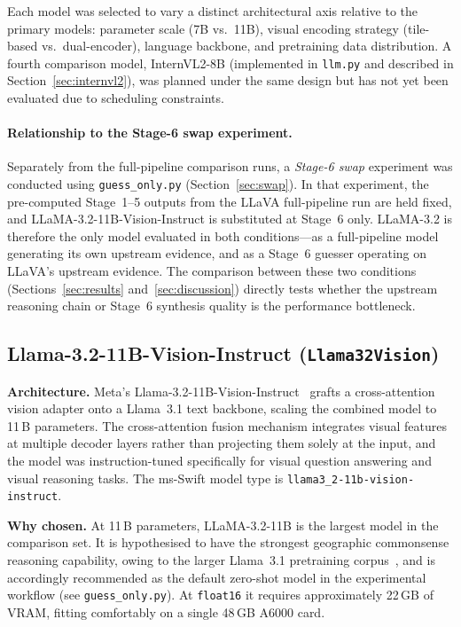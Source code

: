 \documentclass[11pt]{article}
\begin{document}
Each model was selected to vary a distinct architectural axis relative to the primary
models: parameter scale (7B vs.\ 11B), visual encoding strategy (tile-based
vs.\ dual-encoder), language backbone, and pretraining data distribution. A fourth
comparison model, InternVL2-8B (implemented in \texttt{llm.py} and described in
Section~\ref{sec:internvl2}), was planned under the same design but has not yet been
evaluated due to scheduling constraints.

\paragraph{Relationship to the Stage-6 swap experiment.}
Separately from the full-pipeline comparison runs, a \emph{Stage-6 swap} experiment
was conducted using \texttt{guess\_only.py} (Section~\ref{sec:swap}). In that
experiment, the pre-computed Stage~1--5 outputs from the LLaVA full-pipeline run
are held fixed, and LLaMA-3.2-11B-Vision-Instruct is substituted at Stage~6 only.
LLaMA-3.2 is therefore the only model evaluated in both conditions---as a full-pipeline
model generating its own upstream evidence, and as a Stage~6 guesser operating on
LLaVA's upstream evidence. The comparison between these two conditions
(Sections~\ref{sec:results} and~\ref{sec:discussion}) directly tests whether the
upstream reasoning chain or Stage~6 synthesis quality is the performance bottleneck.

\subsection{Llama-3.2-11B-Vision-Instruct (\texttt{Llama32Vision})}

\textbf{Architecture.} Meta's Llama-3.2-11B-Vision-Instruct~\citep{Meta2024Llama3} grafts a
cross-attention vision adapter onto a Llama~3.1 text backbone, scaling the combined model to
11\,B parameters. The cross-attention fusion mechanism integrates visual features at multiple
decoder layers rather than projecting them solely at the input, and the model was
instruction-tuned specifically for visual question answering and visual reasoning tasks. The
ms-Swift model type is \texttt{llama3\_2-11b-vision-instruct}.

\textbf{Why chosen.} At 11\,B parameters, LLaMA-3.2-11B is the largest model in the
comparison set. It is hypothesised to have the strongest geographic commonsense reasoning
capability, owing to the larger Llama~3.1 pretraining corpus~\citep{Meta2024Llama3}, and
is accordingly recommended as the default zero-shot model in the experimental workflow
(see \texttt{guess\_only.py}). At \texttt{float16} it requires approximately 22\,GB of
VRAM, fitting comfortably on a single 48\,GB A6000 card.
\end{document}
